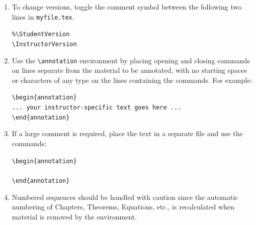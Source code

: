 \begin{enumerate}


 \item To change versions, toggle the comment symbol between the following two lines in \texttt{myfile.tex}.

       \begin{center}
        \verb|%\StudentVersion|\\
        \verb|\InstructorVersion|\\
       \end{center}

 \item Use the \verb|\annotation| environment by placing opening and closing commands on lines
       separate from the material to be annotated, with no starting spaces or characters of any type
       on the lines containing the commands.  For example:

       \begin{center}
        \verb|\begin{annotation}|\\
        \verb|... your instructor-specific text goes here ...|\\
        \verb|\end{annotation}| \\
       \end{center}


 \item If a large comment is required, place the text in a separate file and use the commands:

       \begin{center}
        \verb|\begin{annotation}|\\
        \verb||\\
        \verb|\end{annotation}|\\
       \end{center}

 \item Numbered sequences should be handled with caution
       since the automatic numbering of Chapters, Theorems, Equations, etc., is recalculated when
       material is removed by the environment.


\end{enumerate}
